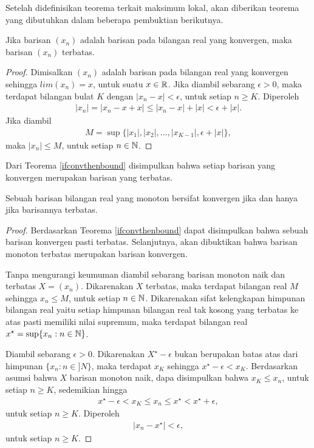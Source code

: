 Setelah didefinisikan teorema terkait maksimum lokal, akan diberikan teorema yang dibutuhkan dalam beberapa pembuktian berikutnya.

\begin{teorema}\label{ifconvthenbound}
Jika barisan $(x_n)$ adalah barisan pada bilangan real yang konvergen, maka barisan $(x_n)$ terbatas.
\end{teorema}

\begin{proof}
    Dimisalkan $(x_n)$ adalah barisan pada bilangan real yang konvergen  sehingga $lim(x_n) = x$, untuk suatu $x \in \mathbb{R}$. Jika diambil sebarang $\epsilon > 0$, maka terdapat bilangan bulat $K$ dengan $|x_n - x| < \epsilon$, untuk setiap $n \geq K$. Diperoleh
    \begin{align*}
        |x_n| = |x_n - x + x| \leq |x_n - x| + |x| < \epsilon + |x|.
    \end{align*}
    Jika diambil
    \begin{align*}
        M = \sup\{|x_1|,|x_2|,\dots,|x_{K-1}|, \epsilon +|x|\},
    \end{align*}
    maka $|x_n| \leq M$, untuk setiap $n \in \mathbb{N}$.
\end{proof}

Dari Teorema \ref{ifconvthenbound} disimpulkan bahwa setiap barisan yang konvergen merupakan barisan yang terbatas.

\begin{teorema}\label{ifmonotonterbatasthenvonf}
    Sebuah barisan bilangan real yang monoton bersifat konvergen jika dan hanya jika barisannya terbatas. 
\end{teorema}

\begin{proof}
    Berdasarkan Teorema \ref{ifconvthenbound} dapat disimpulkan bahwa sebuah barisan konvergen pasti terbatas. Selanjutnya, akan dibuktikan bahwa barisan monoton terbatas merupakan barisan konvergen.

    Tanpa mengurangi keumuman diambil sebarang barisan monoton naik dan terbatas $X = (x_n)$. Dikarenakan $X$ terbatas, maka terdapat bilangan real $M$ sehingga $x_n \leq M$, untuk setiap $n \in \mathbb{N}$. Dikarenakan sifat kelengkapan himpunan bilangan real yaitu setiap himpunan bilangan real tak kosong yang terbatas ke atas pasti memiliki nilai supremum, maka terdapat bilangan real $x^\star = \sup\{x_n : n \in \mathbb{N}\}$.

    Diambil sebarang $\epsilon > 0$. Dikarenakan $X^\star - \epsilon$ bukan berupakan batas atas dari himpunan $\{x_n : n \in ]N\}$, maka terdapat $x_K$ sehingga $x^\star - \epsilon < x_K$. Berdasarkan asumsi bahwa $X$ barisan monoton naik, dapa disimpulkan bahwa $x_K \leq x_n$, untuk setiap $n \geq K$, sedemikian hingga
    \begin{align*}
        x^\star - \epsilon < x_K \leq x_n \leq x^\star < x^\star + \epsilon,
    \end{align*}
    untuk setiap $n \geq K$. Diperoleh
    \begin{align*}
        |x_n - x^\star| < \epsilon,
    \end{align*}
    untuk setiap $n \geq K$.
\end{proof}

